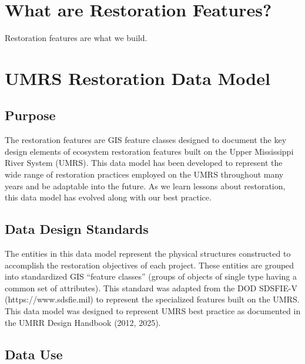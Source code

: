 \documentclass[
  letterpaper,
  DIV=11,
  numbers=noendperiod]{scrreprt}
\begin{document}
\section{What are Restoration
Features?}\label{what-are-restoration-features}

Restoration features are what we build.

\section{UMRS Restoration Data Model}\label{umrs-restoration-data-model}

\subsection{Purpose}\label{purpose}

The restoration features are GIS feature classes designed to document
the key design elements of ecosystem restoration features built on the
Upper Mississippi River System (UMRS). This data model has been
developed to represent the wide range of restoration practices employed
on the UMRS throughout many years and be adaptable into the future. As
we learn lessons about restoration, this data model has evolved along
with our best practice.

\subsection{Data Design Standards}\label{data-design-standards}

The entities in this data model represent the physical structures
constructed to accomplish the restoration objectives of each project.
These entities are grouped into standardized GIS ``feature classes''
(groups of objects of single type having a common set of attributes).
This standard was adapted from the DOD SDSFIE-V (https://www.sdsfie.mil)
to represent the specialized features built on the UMRS. This data model
was designed to represent UMRS best practice as documented in the UMRR
Design Handbook (2012, 2025).

\subsection{Data Use}\label{data-use}
\end{document}
